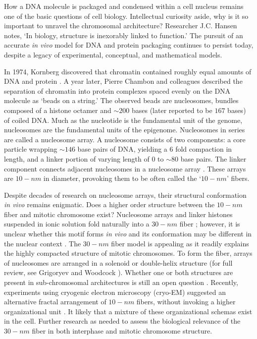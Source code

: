 How a \gls{DNA} molecule is packaged and condensed within a cell nucleus remains one of the basic questions of cell biology.  Intellectual curiosity aside,
why is it so important to unravel the chromosomal architecture?  Researcher J.C. Hansen notes, `In biology, structure is inexorably linked to function.' \citep{hansen2012}
The pursuit of an accurate \textit{\gls{in vivo}} model for \gls{DNA} and protein packaging continues to persist today, despite a legacy of experimental,
conceptual, and mathematical models.

In 1974, Kornberg discovered that chromatin contained roughly equal amounts of \gls{DNA} and protein \citep{kornberg1974}.  A year later, Pierre Chambon
and colleagues described the separation of chromatin into protein complexes spaced evenly on the \gls{DNA} molecule as `beads on a string.' \citep{oudet1975}
The observed beads are nucleosomes, bundles composed of a histone octamer and $\sim200$ bases (later reported to be $167$ bases) \citep{robinson2006} of
coiled \gls{DNA}. Much as the nucleotide is the fundamental unit of the genome, nucleosomes are the fundamental units of the epigenome.  Nucleosomes in
series are called a \gls{nucleosome array}.  A nucleosome consists of two components: a core particle wrapping $\sim146$ base pairs of DNA, yielding a
6 fold compaction in length, and a linker portion of varying length of $0$ to $\sim80$ base pairs.  The linker component connects adjacent nucleosomes
in a nucleosome array \citep{wu2007, hansen2012}.  These arrays are $10-nm$ in diameter, provoking them to be often called the `$10-nm$' fibers.

Despite decades of research on nucleosome arrays, their structural conformation \textit{\gls{in vivo}} remains enigmatic.  Does a higher order structure
between the $10-nm$ fiber and mitotic chromosome exist?  Nucleosome arrays and linker histones suspended in ionic solution fold naturally into a $30-nm$ fiber
\citep{tremethick2007}; however, it is unclear whether this motif forms \textit{\gls{in vivo}} and its conformation may be different in the nuclear context \citep{bian2012}.
The $30-nm$ fiber model is appealing as it readily explains the highly compacted structure of mitotic chromosomes.  To form the fiber, arrays of nucleosomes
are arranged in a solenoid or double-helix structure (for full review, see Grigoryev and Woodcock \citep{grigoryev2012}).  Whether one or both structures
are present in sub-chromosomal architectures is still an open question \citep{song2014}.  Recently, experiments using cryogenic electron microscopy
(cryo-EM) suggested an alternative fractal arrangement of $10-nm$ fibers, without invoking a higher organizational unit \citep{nishino2012,hansen2012}.
It likely that a mixture of these organizational schemas exist in the cell.  Further research as needed to assess the biological relevance of the $30-nm$ fiber in
both interphase and mitotic chromosome structure.

